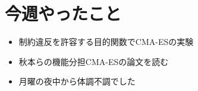\documentclass[twocolumn]{jarticle}
\begin{document}


\section{今週やったこと}
	\begin{itemize}
		\item 制約違反を許容する目的関数でCMA-ESの実験
		\item 秋本らの機能分担CMA-ESの論文\cite{2009F-EC02}を読む
		\item 月曜の夜中から体調不調でした
	\end{itemize}

\end{document}

